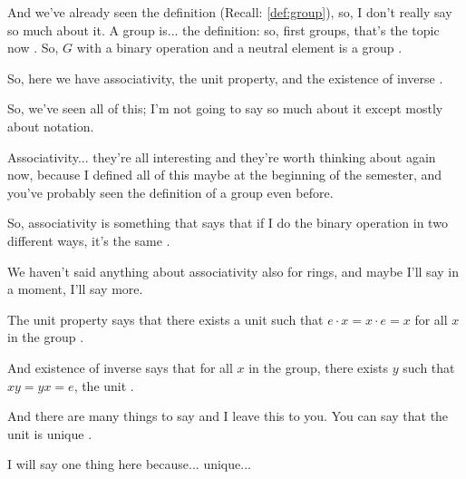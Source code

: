 \begin{speech}[00:44:09 - 00:45:55]
And we've already seen the definition (Recall: \cref{def:group}), so, I don't really say so much about it. A group is... the definition: so, first groups, that's the topic now . So, $G$ with a binary operation and a neutral element is a group .

So, here we have associativity, the unit property, and the existence of inverse .

So, we've seen all of this; I'm not going to say so much about it except mostly about notation.

Associativity... they're all interesting and they're worth thinking about again now, because I defined all of this maybe at the beginning of the semester, and you've probably seen the definition of a group even before.

So, associativity is something that says that if I do the binary operation in two different ways, it's the same .

We haven't said anything about associativity also for rings, and maybe I'll say in a moment, I'll say more.

The unit property says that there exists a unit such that $e \cdot x = x \cdot e = x$ for all $x$ in the group .

And existence of inverse says that for all $x$ in the group, there exists $y$ such that $xy = yx = e$, the unit .

And there are many things to say and I leave this to you. You can say that the unit is unique .
\end{speech}

\begin{speech}[00:45:55 - 00:46:04]
I will say one thing here because...  unique...
\end{speech}


